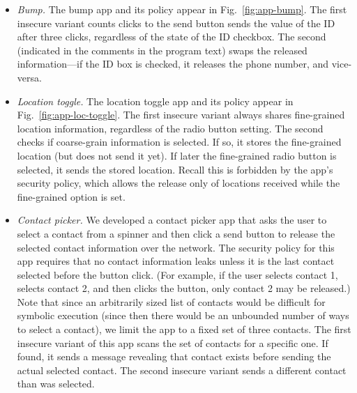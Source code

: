 \documentclass{llncs}
\begin{document}
\begin{itemize}[leftmargin=*]
\item \textit{Bump.} The bump app and its policy appear in
  Fig.~\ref{fig:app-bump}. The first insecure variant counts clicks to
  the send button sends the value of the
  ID after three clicks, regardless of the state of the ID
  checkbox. The second (indicated in the comments in the program text)
  swaps the released information---if the ID
  box is checked, it releases the phone number, and vice-versa.

\item \textit{Location toggle.} The location toggle app and
  its policy appear in Fig.~\ref{fig:app-loc-toggle}. The first insecure
  variant always shares fine-grained location information, regardless
  of the radio button setting. The second checks if coarse-grain
  information is selected. If so, it stores the fine-grained location
  (but does not send it yet).  If later the fine-grained radio button
  is selected, it sends the stored location. Recall this is forbidden
  by the app's security policy, which allows the release only of locations
  received while the fine-grained option is set.

\item \textit{Contact picker.} We developed a contact picker app
  that asks the user to select a contact from a spinner and then
  click a send button to release the selected contact information over the
  network. The security policy for this app requires that no contact
  information leaks unless it is the last contact selected before the
  button click. (For example, if the user selects contact 1,
  selects contact 2, and then clicks the button, only contact 2 may be
  released.) Note that since an arbitrarily sized list of contacts
  would be difficult for symbolic execution (since then there would be
  an unbounded number of ways to select a contact), we limit the app
  to a fixed set of three contacts.
  The first insecure variant of this app scans the set of contacts for a
  specific one. If found, it sends a message revealing that contact
  exists before sending the actual selected contact. The second insecure
  variant sends a different contact than was selected.


\end{itemize}
\end{document}
